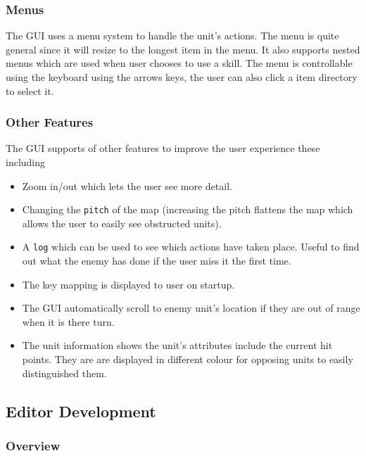 
\subsubsection{Menus}

The GUI uses a menu system to handle the unit's actions. The menu is quite general since it will resize to the longest item in the menu.  It also supports nested menus which are used when user chooses to use a skill. The menu is controllable using the keyboard using the arrows keys, the user can also click a item directory to select it.



\subsubsection{Other Features}
The GUI supports of other features to improve the user experience these including

\begin{itemize}
	\item Zoom in/out which lets the user see more detail. 
	\item Changing the \texttt{pitch} of the map (increasing the pitch flattens the map which allows the user to easily see obstructed units).
	\item A \texttt{log} which can be used to see which actions have taken place. Useful to find out what the enemy has done if the user miss it the first time.
	\item The key mapping is displayed to user on startup.
	\item The GUI automatically scroll to enemy unit's location if they are out of range when it is there turn.
	\item The unit information shows the unit's attributes include the current hit points. They are are displayed in different colour for opposing units to easily distinguished them. 
\end{itemize}


\subsection{Editor Development}

\subsubsection{Overview}
\label{ssub:overview}

